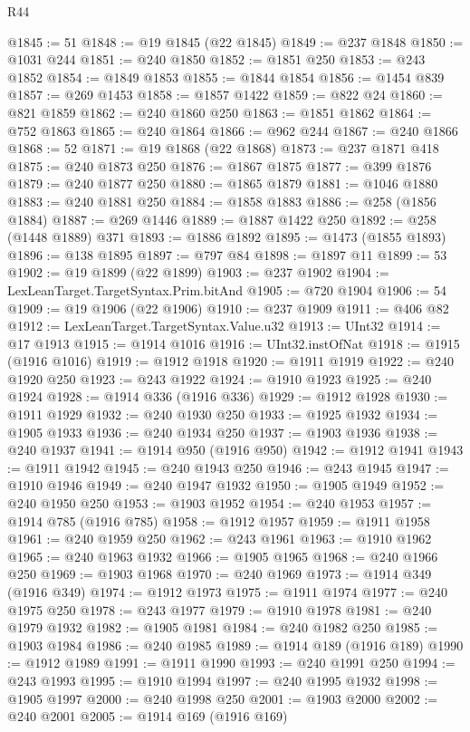 \begin{lexlean}{R44}
\begin{coremodule}
{@1845 := 51
@1848 := @19 @1845 (@22 @1845)
@1849 := @237 @1848
@1850 := @1031 @244
@1851 := @240 @1850
@1852 := @1851 @250
@1853 := @243 @1852
@1854 := @1849 @1853
@1855 := @1844 @1854
@1856 := @1454 @839
@1857 := @269 @1453
@1858 := @1857 @1422
@1859 := @822 @24
@1860 := @821 @1859
@1862 := @240 @1860 @250
@1863 := @1851 @1862
@1864 := @752 @1863
@1865 := @240 @1864
@1866 := @962 @244
@1867 := @240 @1866
@1868 := 52
@1871 := @19 @1868 (@22 @1868)
@1873 := @237 @1871 @418
@1875 := @240 @1873 @250
@1876 := @1867 @1875
@1877 := @399 @1876
@1879 := @240 @1877 @250
@1880 := @1865 @1879
@1881 := @1046 @1880
@1883 := @240 @1881 @250
@1884 := @1858 @1883
@1886 := @258 (@1856 @1884)
@1887 := @269 @1446
@1889 := @1887 @1422 @250
@1892 := @258 (@1448 @1889) @371
@1893 := @1886 @1892
@1895 := @1473 (@1855 @1893)
@1896 := @138 @1895
@1897 := @797 @84
@1898 := @1897 @11
@1899 := 53
@1902 := @19 @1899 (@22 @1899)
@1903 := @237 @1902
@1904 := LexLeanTarget.TargetSyntax.Prim.bitAnd
@1905 := @720 @1904
@1906 := 54
@1909 := @19 @1906 (@22 @1906)
@1910 := @237 @1909
@1911 := @406 @82
@1912 := LexLeanTarget.TargetSyntax.Value.u32
@1913 := UInt32
@1914 := @17 @1913
@1915 := @1914 @1016
@1916 := UInt32.instOfNat
@1918 := @1915 (@1916 @1016)
@1919 := @1912 @1918
@1920 := @1911 @1919
@1922 := @240 @1920 @250
@1923 := @243 @1922
@1924 := @1910 @1923
@1925 := @240 @1924
@1928 := @1914 @336 (@1916 @336)
@1929 := @1912 @1928
@1930 := @1911 @1929
@1932 := @240 @1930 @250
@1933 := @1925 @1932
@1934 := @1905 @1933
@1936 := @240 @1934 @250
@1937 := @1903 @1936
@1938 := @240 @1937
@1941 := @1914 @950 (@1916 @950)
@1942 := @1912 @1941
@1943 := @1911 @1942
@1945 := @240 @1943 @250
@1946 := @243 @1945
@1947 := @1910 @1946
@1949 := @240 @1947 @1932
@1950 := @1905 @1949
@1952 := @240 @1950 @250
@1953 := @1903 @1952
@1954 := @240 @1953
@1957 := @1914 @785 (@1916 @785)
@1958 := @1912 @1957
@1959 := @1911 @1958
@1961 := @240 @1959 @250
@1962 := @243 @1961
@1963 := @1910 @1962
@1965 := @240 @1963 @1932
@1966 := @1905 @1965
@1968 := @240 @1966 @250
@1969 := @1903 @1968
@1970 := @240 @1969
@1973 := @1914 @349 (@1916 @349)
@1974 := @1912 @1973
@1975 := @1911 @1974
@1977 := @240 @1975 @250
@1978 := @243 @1977
@1979 := @1910 @1978
@1981 := @240 @1979 @1932
@1982 := @1905 @1981
@1984 := @240 @1982 @250
@1985 := @1903 @1984
@1986 := @240 @1985
@1989 := @1914 @189 (@1916 @189)
@1990 := @1912 @1989
@1991 := @1911 @1990
@1993 := @240 @1991 @250
@1994 := @243 @1993
@1995 := @1910 @1994
@1997 := @240 @1995 @1932
@1998 := @1905 @1997
@2000 := @240 @1998 @250
@2001 := @1903 @2000
@2002 := @240 @2001
@2005 := @1914 @169 (@1916 @169)
}
\end{coremodule}
\end{lexlean}

